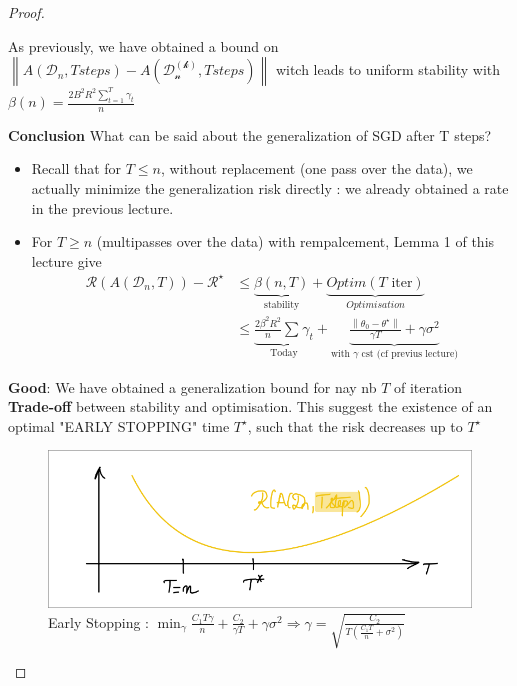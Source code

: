 \begin{proof}
\begin{itemize}
        
        As previously, we have obtained a bound on $\left\| A(\mathcal{D}_n, T steps) - A(\mathcal{D_n^{(k)}}, T steps) \right\| $ witch leads to uniform stability with $\beta (n) = \frac{2B^2R^2 \sum_{t=1}^{T}\gamma _t}{n}$
        
        \textbf{Conclusion} What can be said about the generalization of SGD after T steps?
        \begin{itemize}
            \item Recall that for $T \leq n$, without replacement (one pass over the data), we actually minimize the generalization risk directly : we already obtained a rate in the previous lecture. 
            \item For $ T \geq n $ (multipasses over the data) with rempalcement, Lemma 1 of this lecture give 
            \begin{align*}
                \mathcal{R}(A(\mathcal{D}_n, T)) - \mathcal{R}^\star 
                &\leq \underbrace{\beta (n,T)}_{\text{stability}} + \underbrace{Optim(T \text{ iter})}_{Optimisation} \\
                &\leq \underbrace{\frac{2 \beta ^2 R^2}{n }\sum_{}^{}\gamma _t}_{\text{Today}} + \underbrace{\frac{\left\| \theta _0 - \theta ^\star  \right\| }{\gamma T } + \gamma \sigma ^2}_{\text{with } \gamma \text{ cst (cf previus lecture)} }
            \end{align*}
        \end{itemize}
    \end{itemize}
    \textbf{Good}: We have obtained a generalization bound for nay nb $ T $ of iteration \\
    \textbf{Trade-off} between stability and optimisation. This suggest the existence of an optimal "EARLY STOPPING" time $ T^\star  $, such that the risk decreases up to $ T^\star  $ 
    
    \begin{figure}[!h]
        \centering
        \includegraphics[width=.75\textwidth]{figs/early_stoping.png}
        \caption{Early Stopping : $ \min _\gamma \frac{C_1 T \gamma }{n } + \frac{C_2}{\gamma T} + \gamma \sigma ^2 \Rightarrow \gamma = \sqrt{\frac{C_2}{T(\frac{C_1 T}{n} + \sigma ^2)}} $ }
    \end{figure}
\end{proof}